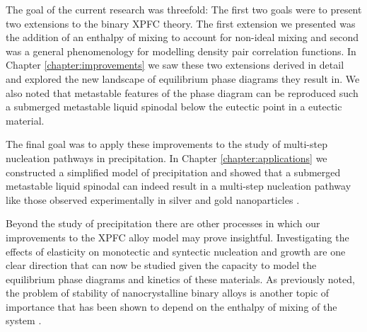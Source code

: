 \label{chapter:conclusion}

The goal of the current research was threefold: The first two goals were to
present two extensions to the binary XPFC theory. The first extension we
presented was the addition of an enthalpy of mixing to account for non-ideal
mixing and second was a general phenomenology for modelling density pair
correlation functions. In Chapter \ref{chapter:improvements} we saw these two
extensions derived in detail and explored the new landscape of equilibrium
phase diagrams they result in. We also noted that metastable features of the
phase diagram can be reproduced such a submerged metastable liquid spinodal
below the eutectic point in a eutectic material. 

The final goal was to apply these improvements to the study of multi-step
nucleation pathways in precipitation. In Chapter \ref{chapter:applications} we
constructed a simplified model of precipitation and showed that a submerged
metastable liquid spinodal can indeed result in a multi-step nucleation pathway
like those observed experimentally in silver and gold nanoparticles
\cite{LOH17}. 

Beyond the study of precipitation there are other processes in which our
improvements to the XPFC alloy model may prove insightful. Investigating the
effects of elasticity on monotectic and  syntectic nucleation and growth are
one clear direction that can now be studied given the capacity to model the
equilibrium phase diagrams and kinetics of these materials. As previously
noted, the problem of stability of nanocrystalline binary alloys is another
topic of importance that has  been shown to depend on the enthalpy of mixing of
the system \cite{MURDOCH13}.
